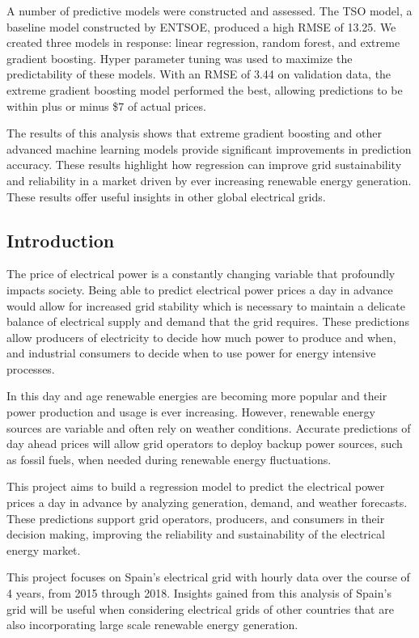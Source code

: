 \documentclass[
]{article}
\begin{document}
A number of predictive models were constructed and assessed. The TSO
model, a baseline model constructed by ENTSOE, produced a high RMSE of
13.25. We created three models in response: linear regression, random
forest, and extreme gradient boosting. Hyper parameter tuning was used
to maximize the predictability of these models. With an RMSE of 3.44 on
validation data, the extreme gradient boosting model performed the best,
allowing predictions to be within plus or minus \$7 of actual prices.

The results of this analysis shows that extreme gradient boosting and
other advanced machine learning models provide significant improvements
in prediction accuracy. These results highlight how regression can
improve grid sustainability and reliability in a market driven by ever
increasing renewable energy generation. These results offer useful
insights in other global electrical grids.

\subsection{Introduction}\label{introduction}

The price of electrical power is a constantly changing variable that
profoundly impacts society. Being able to predict electrical power
prices a day in advance would allow for increased grid stability which
is necessary to maintain a delicate balance of electrical supply and
demand that the grid requires. These predictions allow producers of
electricity to decide how much power to produce and when, and industrial
consumers to decide when to use power for energy intensive processes.

In this day and age renewable energies are becoming more popular and
their power production and usage is ever increasing. However, renewable
energy sources are variable and often rely on weather conditions.
Accurate predictions of day ahead prices will allow grid operators to
deploy backup power sources, such as fossil fuels, when needed during
renewable energy fluctuations.

This project aims to build a regression model to predict the electrical
power prices a day in advance by analyzing generation, demand, and
weather forecasts. These predictions support grid operators, producers,
and consumers in their decision making, improving the reliability and
sustainability of the electrical energy market.

This project focuses on Spain's electrical grid with hourly data over
the course of 4 years, from 2015 through 2018. Insights gained from this
analysis of Spain's grid will be useful when considering electrical
grids of other countries that are also incorporating large scale
renewable energy generation.
\end{document}
